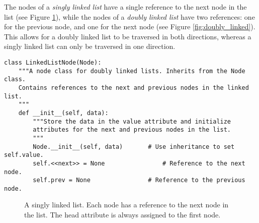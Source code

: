 \begin{comment}
\begin{info} %
Often the data stored in a node is actually a \emph{key} value.
The key might be a memory address, a dictionary key, or the index of an array where the true desired information resides.
For simplicity, in this and the following lab we store actual data in node objects, not references to data located elsewhere.
\end{info}
\end{comment}


The nodes of a \emph{singly linked list} have a single reference to the next node in the list (see Figure \ref{fig:singly_linked}), while the nodes of a \emph{doubly linked list} have two references: one for the previous node, and one for the next node (see Figure \ref{fig:doubly_linked}).
This allows for a doubly linked list to be traversed in both directions, whereas a singly linked list can only be traversed in one direction.


\begin{lstlisting}
class LinkedListNode(Node):
    """A node class for doubly linked lists. Inherits from the Node class.
    Contains references to the next and previous nodes in the linked list.
    """
    def __init__(self, data):
        """Store the data in the value attribute and initialize
        attributes for the next and previous nodes in the list.
        """
        Node.__init__(self, data)       # Use inheritance to set self.value.
        self.<<next>> = None                # Reference to the next node.
        self.prev = None                # Reference to the previous node.
\end{lstlisting}

\begin{figure}[H] %
\centering
{}
\caption{A singly linked list.
Each node has a reference to the next node in the list. The head attribute is always assigned to the first node.}
\label{fig:singly_linked}
\end{figure}


